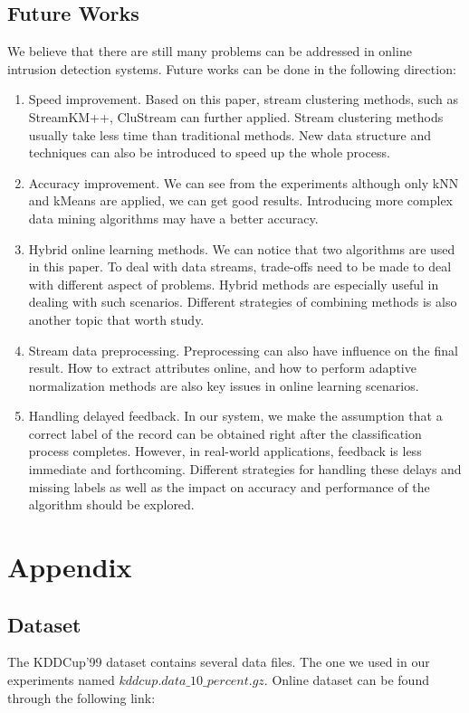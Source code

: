 \documentclass[runningheads]{llncs}
\begin{document}
	\subsection{Future Works}
	We believe that there are still many problems can be addressed in online intrusion detection systems. Future works can be done in the following direction:
	\begin{enumerate}
		\item Speed improvement. Based on this paper, stream clustering methods, such as StreamKM++\cite{Ackermann2012}, CluStream can further applied. Stream clustering methods usually take less time than traditional methods. New data structure and techniques can also be introduced to speed up the whole process.
		\item Accuracy improvement. We can see from the experiments although only kNN and kMeans are applied, we can get good results. Introducing more complex data mining algorithms may have a better accuracy.
		\item Hybrid online learning methods. We can notice that two algorithms are used in this paper. To deal with data streams, trade-offs need to be made to deal with different aspect of problems. Hybrid methods are especially useful in dealing with such scenarios. Different strategies of combining methods is also another topic that worth study.
		\item Stream data preprocessing. Preprocessing can also have influence on the final result. How to extract attributes online, and how to perform adaptive normalization methods are also key issues in online learning scenarios.
		\item Handling delayed feedback. In our system, we make the assumption that a correct label of the record can be obtained right after the classification process completes. However, in real-world applications, feedback is less immediate and forthcoming. Different strategies for handling these delays and missing labels as well as the impact on accuracy and performance of the algorithm should be explored.
	\end{enumerate}

	
	  
	
	\appendix
	\section{Appendix} \label{appendix}
	\subsection{Dataset}
	The KDDCup'99 dataset contains several data files. The one we used in our experiments named $kddcup.data\_10\_percent.gz$. Online dataset can be found through the following link:
	
\end{document}
